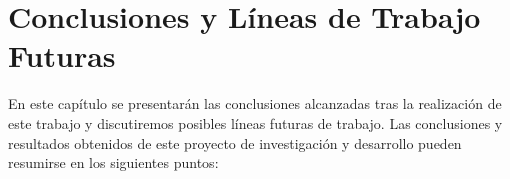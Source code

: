 %
%
%

\chapter{Conclusiones y Líneas de Trabajo Futuras} \label{chap:Conclusiones} 

En este capítulo se presentarán las conclusiones alcanzadas tras la realización de este trabajo y discutiremos posibles líneas futuras de trabajo.
Las conclusiones y resultados obtenidos de este proyecto de investigación y desarrollo pueden resumirse en los siguientes puntos:

